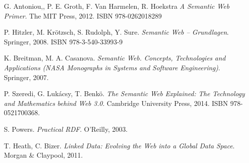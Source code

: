 \documentclass{llncs}
\begin{document}
\begin{thebibliography}{10}
  G. Antoniou,, P. E. Groth, F. Van Harmelen, R. Hoekstra
  \newblock \emph{A Semantic Web Primer}.
  \newblock The MIT Press, 2012. ISBN  978-0262018289

  P. Hitzler, M. Kr\"otzsch, S. Rudolph, Y. Sure. 
  \newblock \emph{Semantic Web – Grundlagen}.
  \newblock Springer, 2008. ISBN 978-3-540-33993-9

  K. Breitman, M. A. Casanova.
  \newblock \emph{Semantic Web. Concepts, Technologies and Applications 
  (NASA Monographs in Systems and Software Engineering)}. 
  \newblock Springer, 2007.

  P. Szeredi, G. Lukácsy, T. Benk\"o. 
  \newblock \emph{The Semantic Web Explained: The Technology and Mathematics 
  behind Web 3.0}. 
  \newblock Cambridge University Press, 2014. ISBN 978-0521700368.

  S. Powers. 
  \newblock \emph{Practical RDF}. 
  \newblock O'Reilly, 2003.

  T. Heath, C. Bizer. 
  \newblock \emph{Linked Data: Evolving the Web into a Global Data Space}. 
  \newblock Morgan \& Claypool, 2011.
\end{thebibliography}

\end{document}
